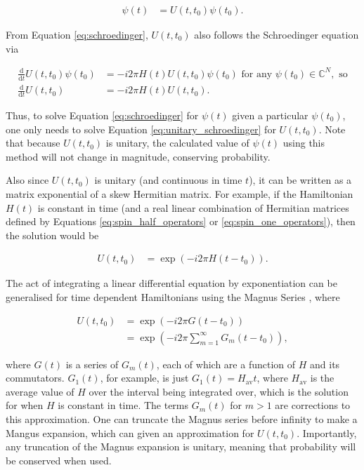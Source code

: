 \documentclass{jors}
\begin{document}
		\begin{align}
			\psi(t) &= U(t, t_0)\psi(t_0).
		\end{align}

		From Equation \eqref{eq:schroedinger}, \(U(t, t_0)\) also follows the Schroedinger equation via

		\begin{align}
			\frac{\mathrm{d}}{\mathrm{d}t}U(t, t_0)\psi(t_0) &= -i2\pi H(t)U(t, t_0)\psi(t_0)\textrm{ for any }\psi(t_0)\in\mathbb{C}^N,\textrm{ so}\\
			\frac{\mathrm{d}}{\mathrm{d}t}U(t, t_0) &= -i2\pi H(t)U(t, t_0).\label{eq:unitary_schroedinger}
		\end{align}

		Thus, to solve Equation \eqref{eq:schroedinger} for \(\psi(t)\) given a particular \(\psi(t_0)\), one only needs to solve Equation \eqref{eq:unitary_schroedinger} for \(U(t, t_0)\). Note that because \(U(t, t_0)\) is unitary, the calculated value of \(\psi(t)\) using this method will not change in magnitude, conserving probability.

		Also since \(U(t, t_0)\) is unitary (and continuous in time \(t\)), it can be written as a matrix exponential of a skew Hermitian matrix. For example, if the Hamiltonian \(H(t)\) is constant in time (and a real linear combination of Hermitian matrices defined by Equations \eqref{eq:spin_half_operators} or \eqref{eq:spin_one_operators}), then the solution would be

		\begin{align}
			U(t, t_0) &= \exp(-i2\pi H(t - t_0)).
		\end{align}

		The act of integrating a linear differential equation by exponentiation can be generalised for time dependent Hamiltonians using the Magnus Series \cite{blanes_magnus_2009}, where
		
		\begin{align}
			U(t, t_0) &= \exp(-i2\pi G(t - t_0))\\
			&= \exp(-i2\pi \sum_{m = 1}^\infty G_m(t - t_0)),
		\end{align}

		where \(G(t)\) is a series of \(G_m(t)\), each of which are a function of \(H\) and its commutators. \(G_1(t)\), for example, is just \(G_1(t) = H_\mathrm{av}t\), where \(H_\mathrm{av}\) is the average value of \(H\) over the interval being integrated over, which is the solution for when \(H\) is constant in time. The terms \(G_m(t)\) for \(m > 1\) are corrections to this approximation. One can truncate the Magnus series before infinity to make a Mangus expansion, which can given an approximation for \(U(t, t_0)\). Importantly, any truncation of the Magnus expansion is unitary, meaning that probability will be conserved when used.
\end{document}
